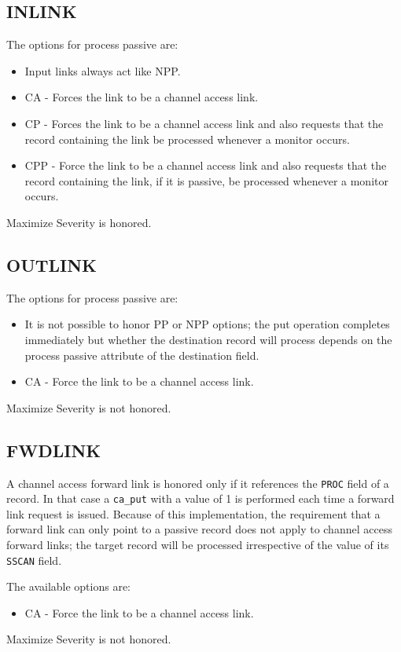 \subsection{INLINK}

The options for process passive are:

\begin{itemize}
\item Input links always act like NPP.

\item CA - Forces the link to be a channel access link.

\item CP - Forces the link to be a channel access link and also requests that the record containing the link be processed whenever a monitor occurs.

\item CPP - Force the link to be a channel access link and also requests that the record containing the link, if it is passive, be processed whenever a monitor occurs.

\end{itemize}

Maximize Severity is honored.

\subsection{OUTLINK}

The options for process passive are:

\begin{itemize}
\item It is not possible to honor PP or NPP options; the put operation completes immediately but whether the destination record will process depends on the process passive attribute of the destination field.

\item CA - Force the link to be a channel access link.

\end{itemize}

Maximize Severity is not honored.

\subsection{FWDLINK}

A channel access forward link is honored only if it references the \verb|PROC| field of a record.
In that case a \verb|ca_put| with a value of 1 is performed each time a forward link request is issued.
Because of this implementation, the requirement that a forward link can only point to a passive record does not apply to channel access forward links;
the target record will be processed irrespective of the value of its \verb|SSCAN| field.

The available options are:

\begin{itemize}

\item CA - Force the link to be a channel access link.

\end{itemize}

Maximize Severity is not honored.


